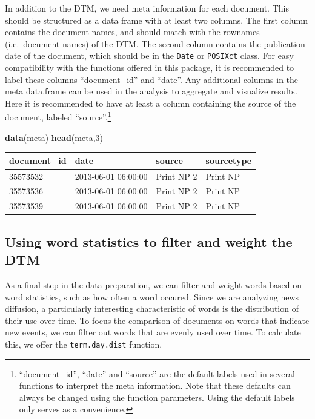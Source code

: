 \documentclass[]{article}
\newenvironment{Shaded}{\begin{snugshade}}{\end{snugshade}}
\newcommand{\KeywordTok}[1]{\textcolor[rgb]{0.13,0.29,0.53}{\textbf{{#1}}}}
\newcommand{\DecValTok}[1]{\textcolor[rgb]{0.00,0.00,0.81}{{#1}}}
\newcommand{\NormalTok}[1]{{#1}}
\let\rmarkdownfootnote\footnote%
\def\footnote{\protect\rmarkdownfootnote}
\begin{document}
In addition to the DTM, we need meta information for each document. This
should be structured as a data frame with at least two columns. The
first column contains the document names, and should match with the
rownames (i.e.~document names) of the DTM. The second column contains
the publication date of the document, which should be in the
\texttt{Date} or \texttt{POSIXct} class. For easy compatibility with the
functions offered in this package, it is recommended to label these
columns ``document\_id'' and ``date''. Any additional columns in the
meta data.frame can be used in the analysis to aggregate and visualize
results. Here it is recommended to have at least a column containing the
source of the document, labeled ``source''.\footnote{``document\_id'',
  ``date'' and ``source'' are the default labels used in several
  functions to interpret the meta information. Note that these defaults
  can always be changed using the function parameters. Using the default
  labels only serves as a convenience.}

\begin{Shaded}
\begin{Highlighting}[]
\KeywordTok{data}\NormalTok{(meta)}
\KeywordTok{head}\NormalTok{(meta,}\DecValTok{3}\NormalTok{)}
\end{Highlighting}
\end{Shaded}

\begin{longtable}[c]{@{}llll@{}}
\toprule
document\_id & date & source & sourcetype\tabularnewline
\midrule
\endhead
35573532 & 2013-06-01 06:00:00 & Print NP 2 & Print NP\tabularnewline
35573536 & 2013-06-01 06:00:00 & Print NP 2 & Print NP\tabularnewline
35573539 & 2013-06-01 06:00:00 & Print NP 2 & Print NP\tabularnewline
\bottomrule
\end{longtable}

\subsection{Using word statistics to filter and weight the
DTM}\label{using-word-statistics-to-filter-and-weight-the-dtm}

As a final step in the data preparation, we can filter and weight words
based on word statistics, such as how often a word occured. Since we are
analyzing news diffusion, a particularly interesting characteristic of
words is the distribution of their use over time. To focus the
comparison of documents on words that indicate new events, we can filter
out words that are evenly used over time. To calculate this, we offer
the \texttt{term.day.dist} function.
\end{document}
